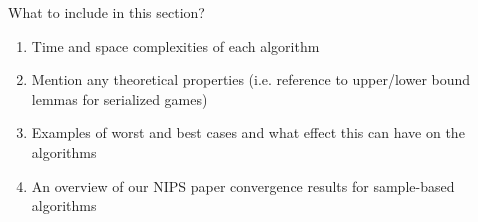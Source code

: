 
What to include in this section?

\begin{enumerate}
\item Time and space complexities of each algorithm
\item Mention any theoretical properties (i.e. reference to upper/lower bound lemmas for serialized games)
\item Examples of worst and best cases and what effect this can have on the algorithms
\item An overview of our NIPS paper convergence results for sample-based algorithms
\end{enumerate}

